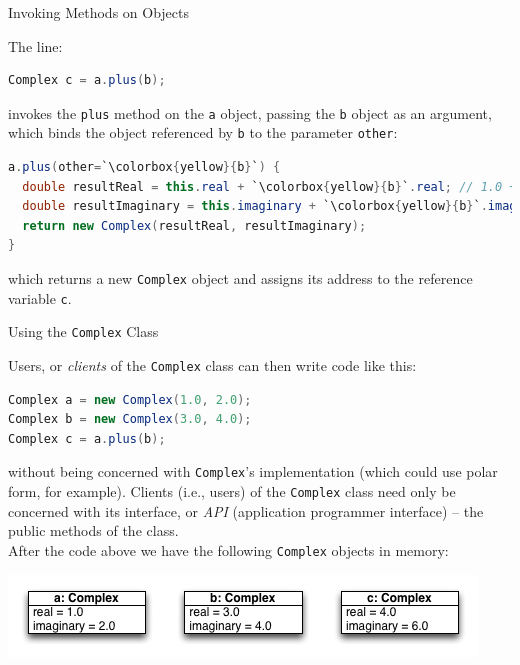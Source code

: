 \documentclass{beamer}
\begin{document}
\begin{frame}[fragile]{Invoking Methods on Objects}


The line:
\begin{lstlisting}[language=Java]
Complex c = a.plus(b);
\end{lstlisting}
invokes the {\tt plus} method on the {\tt a} object, passing the {\tt b} object as an argument, which binds the object referenced by {\tt b} to the parameter {\tt other}:
\begin{lstlisting}[language=Java,escapechar=`]
a.plus(other=`\colorbox{yellow}{b}`) {
  double resultReal = this.real + `\colorbox{yellow}{b}`.real; // 1.0 + 3.0
  double resultImaginary = this.imaginary + `\colorbox{yellow}{b}`.imaginary; // 2.0 + 4.0
  return new Complex(resultReal, resultImaginary);
}
\end{lstlisting}
which returns a new {\tt Complex} object and assigns its address to the  reference variable {\tt c}.

\end{frame}

\begin{frame}[fragile]{Using the {\tt Complex} Class}


Users, or {\it clients} of the {\tt Complex} class can then write code like this:
\begin{lstlisting}[language=Java]
Complex a = new Complex(1.0, 2.0);
Complex b = new Complex(3.0, 4.0);
Complex c = a.plus(b);
\end{lstlisting}

without being concerned with {\tt Complex}'s implementation (which could use polar form, for example).  Clients (i.e., users) of the {\tt Complex} class need only be concerned with its interface, or {\it API} (application programmer interface) -- the public methods of the class.\\
\vspace{.1in}
After the code above we have the following {\tt Complex} objects in memory:
\begin{center}
\includegraphics[height=.7in]{complex-abc.png}
\end{center}

\end{frame}









\end{document}
